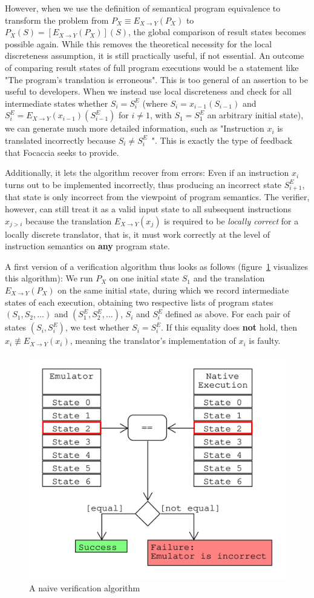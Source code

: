 However, when we use the definition of semantical program equivalence to transform the problem from $P_X \equiv E_{X
\rightarrow Y}(P_X)$ to $P_X(S) = [E_{X \rightarrow Y}(P_X)](S)$, the global comparison of result states becomes
possible again.  While this removes the theoretical necessity for the local discreteness assumption, it is still
practically useful, if not essential. An outcome of comparing result states of full program executions would be a
statement like "The program's translation is erroneous". This is too general of an assertion to be useful to developers.
When we instead use local discreteness and check for all intermediate states whether $S_i = S^E_i$ (where $S_i =
x_{i-1}(S_{i-1})$ and $S^E_i = E_{X \rightarrow Y}(x_{i-1})(S^E_{i-1})$ for $i \neq 1$, with $S_1 = S^E_1$ an arbitrary
initial state), we can generate much more detailed information, such as "Instruction $x_i$ is translated incorrectly
because $S_i \neq S^E_i$~". This is exactly the type of feedback that Focaccia seeks to provide.

Additionally, it lets the algorithm recover from errors: Even if an instruction $x_i$ turns out to be implemented
incorrectly, thus producing an incorrect state $S^E_{i+1}$, that state is only incorrect from the viewpoint of program
semantics. The verifier, however, can still treat it as a valid input state to all subsequent instructions $x_{j > i}$
because the translation $E_{X \rightarrow Y}(x_j)$ is required to be \textit{locally correct} for a locally discrete
translator, that is, it must work correctly at the level of instruction semantics on \textbf{any} program state.

A first version of a verification algorithm thus looks as follows (figure~\ref{fig:naive_algo} visualizes this
algorithm): We run $P_X$ on one initial state $S_1$ and the translation $E_{X \rightarrow Y}(P_X)$ on the same initial
state, during which we record intermediate states of each execution, obtaining two respective lists of program states
$(S_1, S_2, …)$ and $(S^E_1, S^E_2, …)$, $S_i$ and $S^E_i$ defined as above. For each pair of states $(S_i, S^E_i)$, we
test whether $S_i = S^E_i$. If this equality does \textbf{not} hold, then $x_i \not\equiv E_{X \rightarrow Y}(x_i)$,
meaning the translator's implementation of $x_i$ is faulty.

\begin{figure}[htpb]
    \centering
    \includegraphics[width=0.6\linewidth]{figures/naive_algo.png}
    \caption{A naive verification algorithm}\label{fig:naive_algo}
\end{figure}

